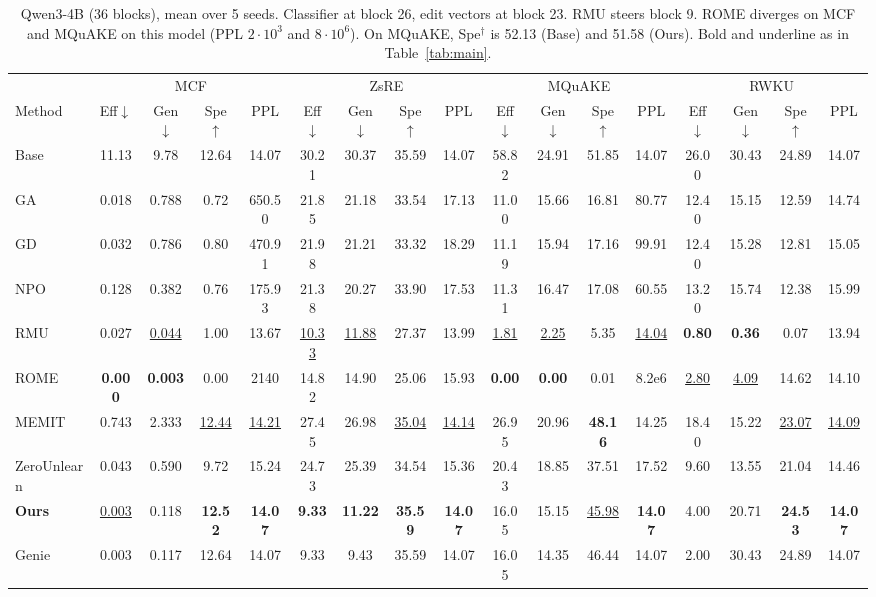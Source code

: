 \documentclass{article}
\theoremstyle{remark}
\theoremstyle{definition}
\begin{document}
\begin{table}[t]
\centering
\small
\setlength{\tabcolsep}{3.2pt}
\begin{tabular}{l cccc cccc cccc cccc}
\toprule
& \multicolumn{4}{c}{MCF} & \multicolumn{4}{c}{ZsRE} & \multicolumn{4}{c}{MQuAKE} & \multicolumn{4}{c}{RWKU} \\
\cmidrule(lr){2-5}\cmidrule(lr){6-9}\cmidrule(lr){10-13}\cmidrule(lr){14-17}
Method & Eff$\downarrow$ & Gen$\downarrow$ & Spe$\uparrow$ & PPL & Eff$\downarrow$ & Gen$\downarrow$ & Spe$\uparrow$ & PPL & Eff$\downarrow$ & Gen$\downarrow$ & Spe$\uparrow$ & PPL & Eff$\downarrow$ & Gen$\downarrow$ & Spe$\uparrow$ & PPL \\
\midrule
Base        & 11.13 & 9.78 & 12.64 & 14.07 & 30.21 & 30.37 & 35.59 & 14.07 & 58.82 & 24.91 & 51.85 & 14.07 & 26.00 & 30.43 & 24.89 & 14.07 \\
\midrule
GA          & 0.018 & 0.788 & 0.72 & 650.50 & 21.85 & 21.18 & 33.54 & 17.13 & 11.00 & 15.66 & 16.81 & 80.77 & 12.40 & 15.15 & 12.59 & 14.74 \\
GD          & 0.032 & 0.786 & 0.80 & 470.91 & 21.98 & 21.21 & 33.32 & 18.29 & 11.19 & 15.94 & 17.16 & 99.91 & 12.40 & 15.28 & 12.81 & 15.05 \\
NPO         & 0.128 & 0.382 & 0.76 & 175.93 & 21.38 & 20.27 & 33.90 & 17.53 & 11.31 & 16.47 & 17.08 & 60.55 & 13.20 & 15.74 & 12.38 & 15.99 \\
RMU         & 0.027 & \underline{0.044} & 1.00 & 13.67 & \underline{10.33} & \underline{11.88} & 27.37 & 13.99 & \underline{1.81} & \underline{2.25} & 5.35 & \underline{14.04} & \textbf{0.80} & \textbf{0.36} & 0.07 & 13.94 \\
ROME        & \textbf{0.000} & \textbf{0.003} & 0.00 & 2140 & 14.82 & 14.90 & 25.06 & 15.93 & \textbf{0.00} & \textbf{0.00} & 0.01 & 8.2e6 & \underline{2.80} & \underline{4.09} & 14.62 & 14.10 \\
MEMIT       & 0.743 & 2.333 & \underline{12.44} & \underline{14.21} & 27.45 & 26.98 & \underline{35.04} & \underline{14.14} & 26.95 & 20.96 & \textbf{48.16} & 14.25 & 18.40 & 15.22 & \underline{23.07} & \underline{14.09} \\
ZeroUnlearn & 0.043 & 0.590 & 9.72 & 15.24 & 24.73 & 25.39 & 34.54 & 15.36 & 20.43 & 18.85 & 37.51 & 17.52 & 9.60 & 13.55 & 21.04 & 14.46 \\
\midrule
\textbf{Ours}& \underline{0.003} & 0.118 & \textbf{12.52} & \textbf{14.07} & \textbf{9.33} & \textbf{11.22} & \textbf{35.59} & \textbf{14.07} & 16.05 & 15.15 & \underline{45.98} & \textbf{14.07} & 4.00 & 20.71 & \textbf{24.53} & \textbf{14.07} \\
Genie       & 0.003 & 0.117 & 12.64 & 14.07 & 9.33 & 9.43 & 35.59 & 14.07 & 16.05 & 14.35 & 46.44 & 14.07 & 2.00 & 30.43 & 24.89 & 14.07 \\
\bottomrule
\end{tabular}
\caption{Qwen3-4B (36 blocks), mean over 5 seeds. Classifier at block 26, edit vectors at block 23. RMU steers block 9. ROME diverges on MCF and MQuAKE on this model (PPL $2\cdot10^3$ and $8\cdot10^6$). On MQuAKE, Spe$^\dagger$ is 52.13 (Base) and 51.58 (Ours). Bold and underline as in Table~\ref{tab:main}.}
\label{tab:qwen4b}
\end{table}
\end{document}
